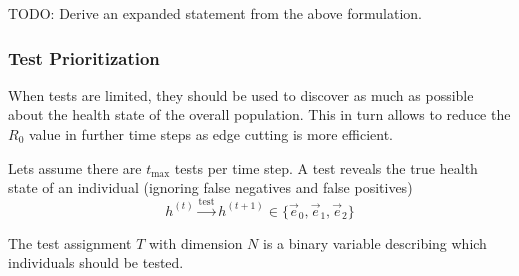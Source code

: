 \documentclass[]{article}
\begin{document}
TODO: Derive an expanded statement from the above formulation.\\

\subsubsection{Test Prioritization}
When tests are limited, they should be used to discover as much as possible about the health state of the overall population.
This in turn allows to reduce the $R_0$ value in further time steps as edge cutting is more efficient.

Lets assume there are $t_{\text{max}}$ tests per time step.
A test reveals the true health state of an individual (ignoring false negatives and false positives)
\begin{equation}
	h^{(t)} \xrightarrow{\text{test}} h^{(t+1)} \in \{\vec{e}_0, \vec{e}_1, \vec{e}_2 \}
\end{equation}

The test assignment $T$ with dimension $N$ is a binary variable describing which individuals should be tested.
\end{document}
